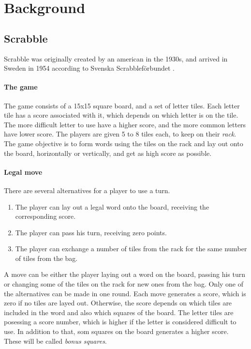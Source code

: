 \documentclass[a4paper, 12pt]{report}
\begin{document}
\chapter{Background}

\section{Scrabble}
Scrabble was originally created by an american in the 1930s, and arrived in Sweden in 1954 according to Svenska Scrabbleförbundet \cite{forbund}. 

\subsubsection{The game}
The game consists of a 15x15 square board, and a set of letter tiles. Each letter tile has a score associated with it, which depends on which letter is on the tile. The more difficult letter to use have a higher score, and the more common letters have lower score. The players are given 5 to 8 tiles each, to keep on their \emph{rack}. The game objective is to form words using the tiles on the rack and lay out onto the board, horizontally or vertically, and get as high score as possible. 

\subsubsection{Legal move}
There are several alternatives for a player to use a turn. 
\begin{enumerate}
\item The player can lay out a legal word onto the board, receiving the corresponding score.
\item The player can pass his turn, receiving zero points.
\item The player can exchange a number of tiles from the rack for the same number of tiles from the bag.
\end{enumerate}


A move can be either the player laying out a word on the board, passing his turn or changing some of the tiles on the rack for new ones from the bag. Only one of the alternatives can be made in one round. Each move generates a score, which is zero if no tiles are layed out. Otherwise, the score depends on which tiles are included in the word and also which squares of the board. The letter tiles are posessing a score number, which is higher if the letter is considered difficult to use. In addition to that, som squares on the board generates a higher score. These will be called \emph{bonus squares}. 
\end{document}
